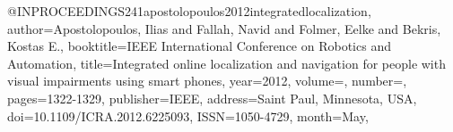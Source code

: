 @INPROCEEDINGS{241apostolopoulos2012integratedlocalization,
author={Apostolopoulos, Ilias and Fallah, Navid and Folmer, Eelke and Bekris, Kostas E.},
booktitle={IEEE International Conference on Robotics and Automation}, 
title={Integrated online localization and navigation for people with visual impairments using smart phones}, 
year={2012},
volume={},
number={},
pages={1322-1329},
publisher={IEEE},
address={Saint Paul, Minnesota, USA},
doi={10.1109/ICRA.2012.6225093},
ISSN={1050-4729},
month={May},}